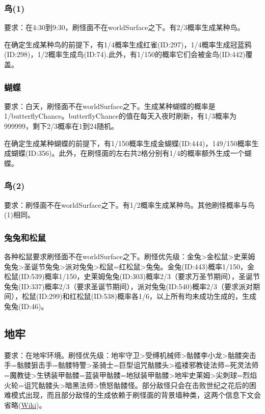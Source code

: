 \subsubsection{鸟(1)}\label{app13}
要求：在4:30到9:30，刷怪面不在worldSurface之下。有2/3概率生成某种鸟。

在确定生成某种鸟的前提下，有1/4概率生成红雀(ID:297)，1/4概率生成冠蓝鸦(ID:298)，1/2概率生成鸟(ID:74).此外，有1/150的概率它们会被金鸟(ID:442)覆盖。

\subsubsection{蝴蝶}\label{app11}
要求：白天，刷怪面不在worldSurface之下。生成某种蝴蝶的概率是1/butterflyChance。butterflyChance的值在每天入夜时刷新，有1/3概率为999999，剩下2/3概率在1到24随机。

在确定生成某种蝴蝶的前提下，有1/150概率生成金蝴蝶(ID:444)，149/150概率生成蝴蝶(ID:356)。此外，在刷怪面的左右共2格分别有1/4的概率额外生成一个蝴蝶。

\subsubsection{鸟(2)}
要求：刷怪面不在worldSurface之下。有1/2概率生成某种鸟。其他刷怪概率与鸟(1)相同。

\subsubsection{兔兔和松鼠}\label{app12}
各种松鼠要求刷怪面不在worldSurface之下。刷怪优先级：金兔>金松鼠>史莱姆兔兔>圣诞节兔兔>派对兔兔>松鼠=红松鼠>兔兔。金兔(ID:443)概率1/150，金松鼠(ID:539)概率1/150，史莱姆兔兔(ID:303)概率2/3（要求万圣节期间），圣诞节兔兔(ID:337)概率2/3（要求圣诞节期间），派对兔兔(ID:540)概率2/3（要求派对期间），松鼠(ID:299)和红松鼠(ID:538)概率各1/6，以上所有均未成功生成的，生成兔兔(ID:46)。

\subsection{地牢}
要求：在地牢环境。刷怪优先级：地牢守卫>受缚机械师>骷髅李小龙>骷髅突击手=骷髅狙击手=骷髅特警>圣骑士=巨型诅咒骷髅头>褴褛邪教徒法师=死灵法师=魔教徒>生锈装甲骷髅=蓝装甲骷髅=地狱装甲骷髅>地牢史莱姆>尖刺球=烈焰火轮=诅咒骷髅头>暗黑法师>愤怒骷髅怪。部分敌怪只会在击败世纪之花后的困难模式出现，而且部分敌怪的生成依赖于刷怪面的背景墙种类，这两个信息下文会省略(\href{https://terraria-zh.gamepedia.com/地牢\#.E5.9B.B0.E9.9A.BE.E6.A8.A1.E5.BC.8F.E4.B8.96.E7.BA.AA.E4.B9.8B.E8.8A.B1.E5.90.8E.E7.9A.84.E5.9C.B0.E7.89.A2}{Wiki})。

